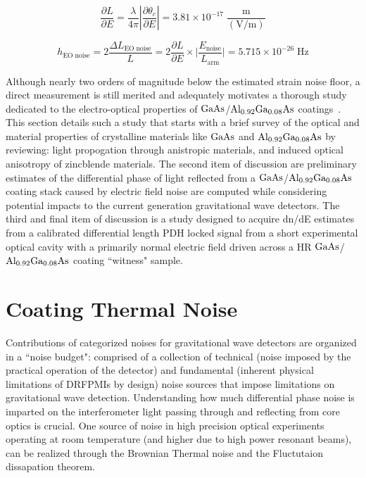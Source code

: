 \begin{equation*}
    \frac{\partial L}{\partial E} = \frac{\lambda}{4 \pi} | \frac{\partial \theta_c}{\partial E} | = 3.81 \times 10^{-17} \; \frac{\mathrm{m}}{(\mathrm{V/m})}
\end{equation*}

\begin{equation}
h_\mathrm{EO\; noise} = 2\frac{\Delta L_\mathrm{EO \; noise}}{L} = 2\frac{\partial L}{\partial E} \times \bigg| \frac{E_\mathrm{noise}}{L_\mathrm{arm}} \bigg| = 5.715 \times 10^{-26} \; \mathrm{Hz}
\end{equation}

Although nearly two orders of magnitude below the estimated strain noise floor, a direct measurement is still merited and adequately motivates a thorough study dedicated to the electro-optical properties of $\mathrm{GaAs}$/$\mathrm{Al_{0.92}Ga_{0.08}As}$ coatings~\cite{buikema:2020}. This section details such a study that starts with a brief survey of the optical and material properties of crystalline materials like $\mathrm{GaAs}$ and $\mathrm{Al_{0.92}Ga_{0.08}As}$ by reviewing: light propogation through anistropic materials, and induced optical anisotropy of zincblende materials. The second item of discussion are preliminary estimates of the differential phase of light reflected from a $\mathrm{GaAs}$/$\mathrm{Al_{0.92}Ga_{0.08}As}$ coating stack caused by electric field noise are computed while considering potential impacts to the current generation gravitational wave detectors. The third and final item of discussion is a study designed to acquire dn/dE estimates from a calibrated differential length PDH locked signal from a short experimental optical cavity with a primarily normal electric field driven across a HR $\mathrm{GaAs}$/$\mathrm{Al_{0.92}Ga_{0.08}As}$ coating ``witness" sample.

\section{Coating Thermal Noise}
Contributions of categorized noises for gravitational wave detectors are organized in a ``noise budget": comprised of a collection of technical (noise imposed by the practical operation of the detector) and fundamental (inherent physical limitations of DRFPMIs by design) noise sources that impose limitations on gravitational wave detection. Understanding how much differential phase noise is imparted on the interferometer light passing through and reflecting from core optics is crucial.
One source of noise in high precision optical experiments operating at room temperature (and higher due to high power resonant beams), can be realized through the Brownian Thermal noise and the Fluctutaion dissapation theorem. 

